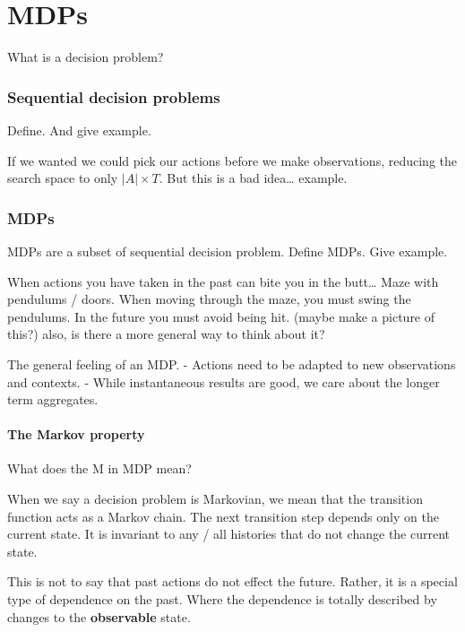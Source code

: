 \chapter{MDPs}

What is a decision problem?

\hypertarget{sequential-decision-problems}{%
\subsection{Sequential decision
problems}\label{sequential-decision-problems}}

Define. And give example.

If we wanted we could pick our actions before we make observations,
reducing the search space to only \(|A| \times T\). But this is a bad
idea\ldots{} example.

\hypertarget{mdps}{%
\subsection{MDPs}\label{mdps}}

MDPs are a subset of sequential decision problem. Define MDPs. Give
example.

When actions you have taken in the past can bite you in the butt\ldots{}
Maze with pendulums / doors. When moving through the maze, you must
swing the pendulums. In the future you must avoid being hit. (maybe make
a picture of this?) also, is there a more general way to think about it?

The general feeling of an MDP. - Actions need to be adapted to new
observations and contexts. - While instantaneous results are good, we
care about the longer term aggregates.

\hypertarget{the-markov-property}{%
\subsubsection{The Markov property}\label{the-markov-property}}

What does the M in MDP mean?

When we say a decision problem is Markovian, we mean that the transition
function acts as a Markov chain. The next transition step depends only
on the current state. It is invariant to any / all histories that do not
change the current state.

This is not to say that past actions do not effect the future. Rather,
it is a special type of dependence on the past. Where the dependence is
totally described by changes to the \textbf{observable} state.

